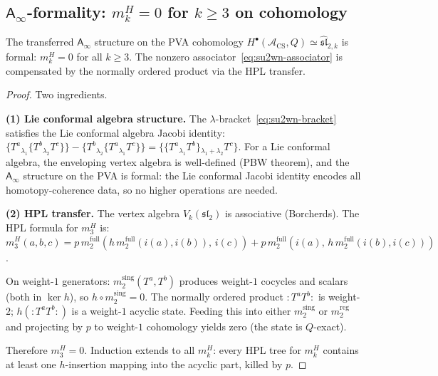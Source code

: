 \documentclass[11pt]{article}
\newcommand{\cA}{\mathcal{A}}
\newcommand{\fsl}{\mathfrak{sl}}
\newcommand{\Ainf}{\mathsf{A}_{\infty}}
\newcommand{\normord}[1]{:\!#1\!:}
\begin{document}
\subsection{$\Ainf$-formality: $m_k^H = 0$ for $k \geq 3$ on cohomology}

\begin{theorem}[$\Ainf$-formality for $\widehat{\fsl}_2$]
\label{thm:su2wn-formality}
The transferred $\Ainf$ structure on the PVA cohomology
$H^\bullet(\cA_{\mathrm{CS}}, Q) \simeq \widehat{\fsl}_{2,k}$
is formal:
$m_k^H = 0$ for all $k \geq 3$.
The nonzero associator~\eqref{eq:su2wn-associator} is compensated
by the normally ordered product via the HPL transfer.
\end{theorem}

\begin{proof}
Two ingredients.

\medskip\noindent
\textbf{(1) Lie conformal algebra structure.}
The $\lambda$-bracket~\eqref{eq:su2wn-bracket} satisfies the
Lie conformal algebra Jacobi identity:
$\{T^a{}_{\lambda_1}\{T^b{}_{\lambda_2} T^c\}\}
- \{T^b{}_{\lambda_2}\{T^a{}_{\lambda_1} T^c\}\}
= \{\{T^a{}_{\lambda_1} T^b\}{}_{\lambda_1+\lambda_2} T^c\}$.
For a Lie conformal algebra, the enveloping vertex algebra is
well-defined (PBW theorem), and the $\Ainf$ structure on the
PVA is formal: the Lie conformal Jacobi identity encodes all
homotopy-coherence data, so no higher operations are needed.

\medskip\noindent
\textbf{(2) HPL transfer.}
The vertex algebra $V_k(\fsl_2)$ is associative (Borcherds).
The HPL formula for $m_3^H$ is:
$m_3^H(a,b,c) = p\, m_2^{\mathrm{full}}
(h\, m_2^{\mathrm{full}}(i(a), i(b)),\, i(c))
+ p\, m_2^{\mathrm{full}}
(i(a),\, h\, m_2^{\mathrm{full}}(i(b), i(c)))$.

On weight-$1$ generators: $m_2^{\mathrm{sing}}(T^a, T^b)$
produces weight-$1$ cocycles and scalars (both in $\ker h$),
so $h \circ m_2^{\mathrm{sing}} = 0$.  The normally ordered
product $\normord{T^a T^b}$ is weight-$2$; $h(\normord{T^a T^b})$
is a weight-$1$ acyclic state.  Feeding this into either
$m_2^{\mathrm{sing}}$ or $m_2^{\mathrm{reg}}$ and projecting
by $p$ to weight-$1$ cohomology yields zero (the state is
$Q$-exact).

Therefore $m_3^H = 0$.  Induction extends to all $m_k^H$:
every HPL tree for $m_k^H$ contains at least one $h$-insertion
mapping into the acyclic part, killed by $p$.
\end{proof}
\end{document}
